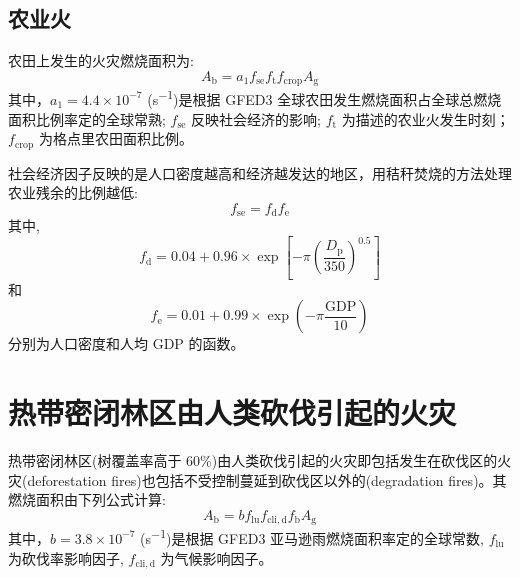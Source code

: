 \subsection{农业火}

农田上发生的火灾燃烧面积为:
\begin{equation}
  A_{\mathrm{b}}=a_{1} f_{\mathrm{s e}} f_{\mathrm{t}} f_{\mathrm{c r o p}} A_{\mathrm{g}}
\end{equation}
%
其中，$a_{1} =4.4\times10^{-7}$ (\unit{s^{-1}})是根据 GFED3 全球农田发生燃烧面积占全球总燃烧面积比例率定的全球常熟; $f_{\mathrm{se}}$ 反映社会经济的影响; $f_{\mathrm {t}} $ 为描述的农业火发生时刻；$f_{\mathrm{crop}}$ 为格点里农田面积比例。


社会经济因子反映的是人口密度越高和经济越发达的地区，用秸秆焚烧的方法处理农业残余的比例越低:
\begin{equation}
  f_{\mathrm{se}} = f_{\mathrm {d}}  f_{\mathrm {e}}
\end{equation}
其中,
\begin{equation}
  f_{\mathrm{d}}=0.04+0.96 \times \exp \left[-\pi\left(\frac{D_{\mathrm{p}}}{350}\right)^{0.5}\right]
\end{equation}
和
\begin{equation}
  f_{\mathrm{e}}=0.01+0.99 \times \exp \left(-\pi \frac{\text{GDP}}{10}\right)
\end{equation}
分别为人口密度和人均 GDP 的函数。


\section{热带密闭林区由人类砍伐引起的火灾}
热带密闭林区(树覆盖率高于 60\%)由人类砍伐引起的火灾即包括发生在砍伐区的火灾(deforestation fires)也包括不受控制蔓延到砍伐区以外的(degradation fires)。其燃烧面积由下列公式计算:
\begin{equation}
  A_{\mathrm{b}}=b f_{\mathrm{l u}} f_{\mathrm{c l i, d}} f_{\mathrm{b}} A_{\mathrm{g}}
\end{equation}
%
其中，$b =3.8\times10^{-7}$ (\unit{s^{-1}})是根据 GFED3 亚马逊雨燃烧面积率定的全球常数, $f_{\mathrm{lu}}$ 为砍伐率影响因子, $f_{\mathrm{cli,d}}$ 为气候影响因子。

